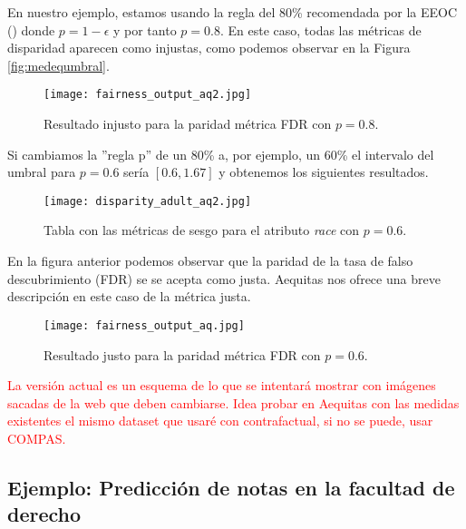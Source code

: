 En nuestro ejemplo, estamos usando la regla del 80\% recomendada por la EEOC (\cite{adverse2009}) donde $p=1-\epsilon$ y por tanto $p=0.8$. En este caso, todas las métricas de disparidad aparecen como injustas, como podemos observar en la Figura \ref{fig:medequmbral}.\\

\begin{figure}[h]
	\centering
	\texttt{[image: fairness\_output\_aq2.jpg]}
	\caption{Resultado injusto para la paridad métrica FDR con $p=0.8$.}
    \label{fig:ejunfairaq2}
\end{figure}

Si cambiamos la ''regla p'' de un 80\% a, por ejemplo, un 60\% el intervalo del umbral para $p=0.6$ sería $[0.6,1.67]$ y obtenemos los siguientes resultados.

\begin{figure}[h]
	\centering
	\texttt{[image: disparity\_adult\_aq2.jpg]}
	\caption{Tabla con las métricas de sesgo para el atributo \textit{race} con $p=0.6$.}
    \label{fig:ejaq22}
\end{figure}

En la figura anterior podemos observar que la paridad de la tasa de falso descubrimiento (FDR) se se acepta como justa. Aequitas nos ofrece una breve descripción en este caso de la métrica justa.\\

\begin{figure}[h]
	\centering
	\texttt{[image: fairness\_output\_aq.jpg]}
	\caption{Resultado justo para la paridad métrica FDR con $p=0.6$.}
    \label{fig:ejunfairaq}
\end{figure}



\textcolor{red}{La versión actual es un esquema de lo que se intentará mostrar con imágenes sacadas de la web que deben cambiarse. Idea probar en Aequitas con las medidas existentes el mismo dataset que usaré con contrafactual, si no se puede, usar COMPAS.}

\subsection{Ejemplo: Predicción de notas en la facultad de derecho}